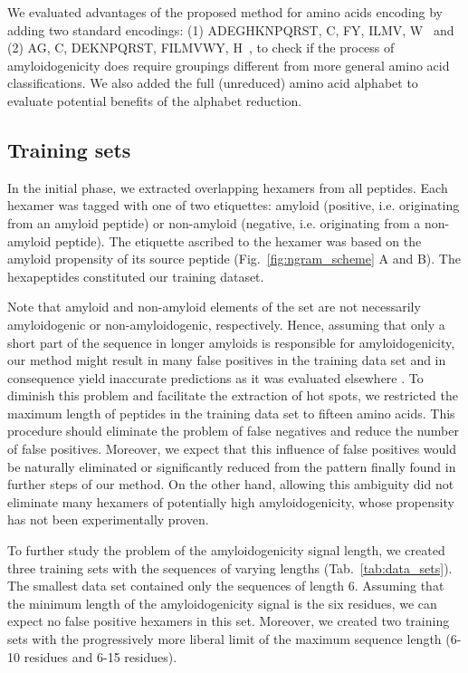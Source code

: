 \documentclass[fleqn,10pt,twoside]{gcb15submission}
\begin{document}
  We evaluated advantages of the proposed method for amino acids encoding by 
adding two standard encodings: (1) ADEGHKNPQRST, C, FY, ILMV, W~\citep{kosiol_new_2004} 
and (2) AG, C, DEKNPQRST, FILMVWY, H~\citep{melo_accuracy_2006}, to check if the process 
of amyloidogenicity does require groupings different from more general 
amino acid classifications. We also added the full (unreduced) amino acid 
alphabet to 
evaluate potential benefits of the alphabet reduction.

\subsection{Training sets}


In the initial phase, we extracted overlapping hexamers from all peptides. Each 
hexamer was tagged with one of two etiquettes: amyloid (positive, i.e. 
originating from an amyloid peptide) or non-amyloid (negative, i.e. originating 
from a non-amyloid peptide). The etiquette ascribed to the hexamer was based on 
the amyloid propensity of its source peptide (Fig.~\ref{fig:ngram_scheme} A and 
B). The hexapeptides constituted our training dataset. 

  Note that amyloid and non-amyloid elements of the set are not necessarily 
amyloidogenic or non-amyloidogenic, respectively. Hence, assuming that only a 
short part of the sequence in longer amyloids is responsible for 
amyloidogenicity, our method might result in many false positives in the 
training data set and in consequence yield inaccurate predictions as it was 
evaluated elsewhere \citep{kotulska_amyloid_2013}. To diminish this problem and 
facilitate the extraction of hot spots, we restricted the maximum length of 
peptides in the training data set to fifteen amino acids. This procedure should 
eliminate the problem of false negatives and reduce the number of false 
positives. Moreover, we expect that this  influence of false positives  would be 
naturally eliminated or significantly reduced from the pattern finally found in 
further steps of our method. On the other hand, allowing this ambiguity did not eliminate 
many hexamers of potentially high amyloidogenicity, whose propensity has not 
been experimentally proven. 

  To further study the problem of the amyloidogenicity signal length, we 
created three training sets with the sequences of varying lengths 
(Tab.~\ref{tab:data_sets}). The smallest data set contained only the sequences 
of length 6. Assuming that the minimum length of the amyloidogenicity signal is 
the six residues, we can expect no false positive hexamers in this set. 
Moreover, we created two training sets with the progressively more liberal limit 
of the maximum sequence length (6-10 residues and 6-15 residues).
\end{document}
